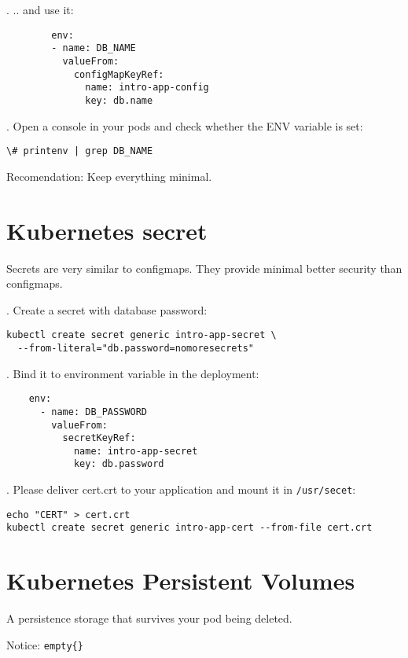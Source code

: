 \documentclass[12pt, letterpaper]{article}
\begin{document}
. .. and use it:

\begin{verbatim}
        env:
        - name: DB_NAME
          valueFrom:
            configMapKeyRef:
              name: intro-app-config
              key: db.name
\end{verbatim}

. Open a console in your pods and check whether the ENV variable is set:

\begin{verbatim}
\# printenv | grep DB_NAME
\end{verbatim}

\bigskip
Recomendation: Keep everything minimal.
%
%
%
\section{Kubernetes secret}

Secrets are very similar to configmaps. They provide minimal better security than configmaps.

. Create a secret with database password:

\begin{verbatim}
kubectl create secret generic intro-app-secret \
  --from-literal="db.password=nomoresecrets"
\end{verbatim}

. Bind it to environment variable in the deployment:

\begin{verbatim}
    env:
      - name: DB_PASSWORD
        valueFrom:
          secretKeyRef:
            name: intro-app-secret
            key: db.password
\end{verbatim}


. Please deliver cert.crt to your application and mount it in \verb|/usr/secet|:

\begin{verbatim}
echo "CERT" > cert.crt
kubectl create secret generic intro-app-cert --from-file cert.crt
\end{verbatim}


%
\section{Kubernetes Persistent Volumes}

A persistence storage that survives your pod being deleted.

Notice: \verb|empty{}|
\end{document}
